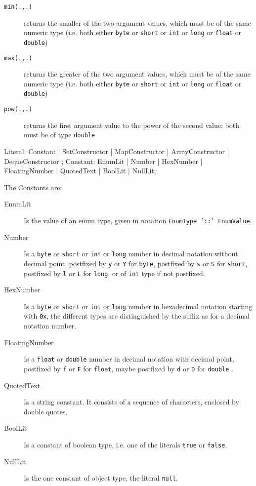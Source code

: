 \begin{description}
\item[\texttt{min(.,.)}] returns the smaller of the two argument values, which must be of the same numeric type (i.e. both either \texttt{byte} or \texttt{short} or \texttt{int} or \texttt{long} or \texttt{float} or \texttt{double})
\item[\texttt{max(.,.)}] returns the greater of the two argument values, which must be of the same numeric type (i.e. both either \texttt{byte} or \texttt{short} or \texttt{int} or \texttt{long} or \texttt{float} or \texttt{double})
\item[\texttt{pow(.,.)}] returns the first argument value to the power of the second value; both must be of type \texttt{double}
\end{description}

\begin{rail}
  Literal: Constant | SetConstructor | MapConstructor | ArrayConstructor | DequeConstructor ;
  Constant: EnumLit | Number | HexNumber | FloatingNumber | QuotedText | BoolLit | NullLit;
\end{rail}\label{literaldef}

The Constants are:
\begin{description}
  \item[EnumLit] Is the value of an enum type, given in notation \texttt{EnumType '::' EnumValue}.
  \item[Number] Is a \texttt{byte} or \texttt{short} or \texttt{int} or \texttt{long} number in decimal notation without decimal point, postfixed by \texttt{y} or \texttt{Y} for \texttt{byte}, postfixed by \texttt{s} or \texttt{S} for \texttt{short}, postfixed by \texttt{l} or \texttt{L} for \texttt{long}, or of \texttt{int} type if not postfixed.
  \item[HexNumber] Is a \texttt{byte} or \texttt{short} or \texttt{int} or \texttt{long} number in hexadecimal notation starting with \texttt{0x}, the different types are distinguished by the suffix as for a decimal notation number.
  \item[FloatingNumber] Is a \texttt{float} or \texttt{double} number in decimal notation with decimal point, postfixed by \texttt{f} or \texttt{F} for \texttt{float}, maybe postfixed by \texttt{d} or \texttt{D} for \texttt{double} .
  \item[QuotedText] Is a string constant. It consists of a sequence of characters, enclosed by double quotes.
  \item[BoolLit] Is a constant of boolean type, i.e. one of the literals \texttt{true} or \texttt{false}.
  \item[NullLit] Is the one constant of object type, the literal \texttt{null}.
\end{description}

